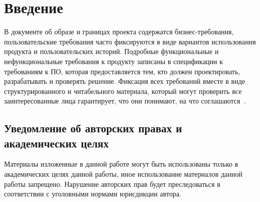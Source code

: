 \chapter*{Введение}
\label{ch:intro}

В документе об образе и границах проекта содержатся бизнес-требования, пользовательские требования часто фиксируются в
виде вариантов использования продукта и пользовательских историй.
Подробные функциональные и нефункциональные требования к продукту записаны в спецификации к требованиям к ПО,
которая предоставляется тем, кто должен проектировать, разрабатывать и проверять решение.
Фиксация всех требований вместе в виде структурированного и читабельного материала, который могут проверить
все заинтересованные лица гарантирует, что они понимают, на что соглашаются~\cite{vigers,vigersRu}.

\section*{Уведомление об авторских правах и академических целях}
\label{sec:copyright}

Материалы изложенные в данной работе могут быть использованы только в академических целях данной работы,
иное использование материалов данной работы запрещено.
Нарушение авторских прав будет преследоваться в соответствии с уголовными нормами юрисдикции автора.
\endinput
